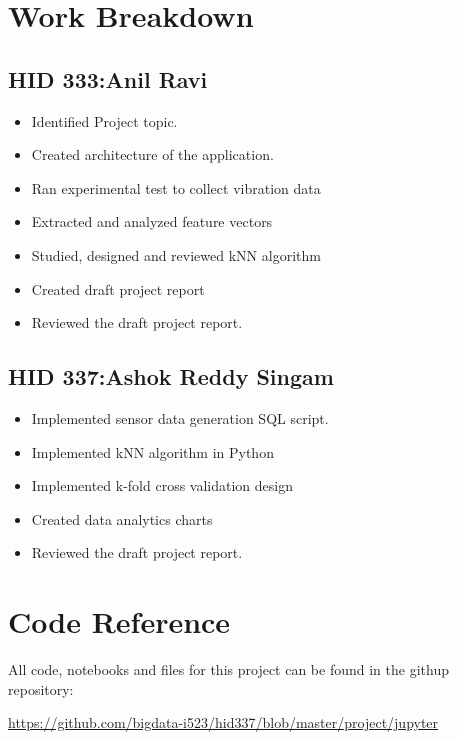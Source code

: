 \documentclass[sigconf]{acmart}
\begin{document}

 
\newpage
\appendix
\section{Work Breakdown}
\subsection{HID 333:Anil Ravi}
\begin{itemize}
  \item Identified Project topic.
  \item Created architecture of the application.
  \item Ran experimental test to collect vibration data
  \item Extracted and analyzed feature vectors
  \item Studied, designed and reviewed kNN algorithm
  \item Created draft project report
  \item Reviewed the draft project report.
  
\end{itemize}
\subsection{HID 337:Ashok Reddy Singam}
\begin{itemize}
  \item Implemented sensor data generation SQL script.
  \item Implemented kNN algorithm in Python
  \item Implemented k-fold cross validation design
  \item Created data analytics charts
  \item Reviewed the draft project report.
\end{itemize}

\section{Code Reference}
All code, notebooks and files for this project can be found in the githup repository:


\url{https://github.com/bigdata-i523/hid337/blob/master/project/jupyter}
\end{document}
